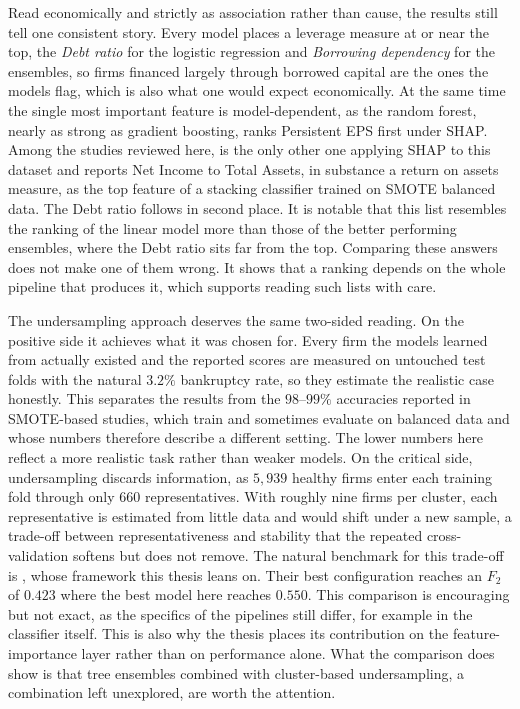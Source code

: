 Read economically and strictly as association rather than cause, the results
still tell one consistent story. Every model places a leverage measure at or
near the top, the \emph{Debt ratio} for the logistic regression and \emph{Borrowing
dependency} for the ensembles, so firms financed largely through borrowed capital
are the ones the models flag, which is also what one would expect economically.
At the same time the single most important feature is model-dependent, as the
random forest, nearly as strong as gradient boosting, ranks Persistent EPS first
under SHAP. Among the studies reviewed here, \textcite{sinap2025} is the only
other one applying SHAP to this dataset and reports Net Income to Total Assets,
in substance a return on assets measure, as the top feature of a stacking
classifier trained on SMOTE balanced data. The Debt ratio follows in second place. It is
notable that this list resembles the ranking of the linear model more than
those of the better performing ensembles, where the Debt ratio sits far from
the top. Comparing these answers does not make one of them wrong. It shows that
a ranking depends on the whole pipeline that produces it, which supports
reading such lists with care.

The undersampling approach deserves the same two-sided reading. On the positive
side it achieves what it was chosen for. Every firm the models learned from
actually existed and the reported scores are measured on untouched test folds
with the natural $3.2\%$ bankruptcy rate, so they estimate the realistic case
honestly. This separates the results from the $98$--$99\%$ accuracies reported in
SMOTE-based studies, which train and sometimes evaluate on balanced data and
whose numbers therefore describe a different setting. The lower numbers here
reflect a more realistic task rather than weaker models. On the critical side,
undersampling discards information, as $5{,}939$ healthy firms enter each
training fold through only $660$ representatives. With roughly nine firms per
cluster, each representative is estimated from little data and would shift under
a new sample, a trade-off between representativeness and stability that the
repeated cross-validation softens but does not remove. 
The natural benchmark for this trade-off is \textcite{wangliu2021}, whose
framework this thesis leans on. Their best configuration reaches an $F_2$ of
$0.423$ where the best model here reaches $0.550$. This comparison is
encouraging but not exact, as the specifics of the pipelines still differ, for
example in the classifier itself. This is also why the thesis places its
contribution on the feature-importance layer rather than on performance alone.
What the comparison does show is that tree ensembles combined with
cluster-based undersampling, a combination \textcite{wangliu2021} left
unexplored, are worth the attention.